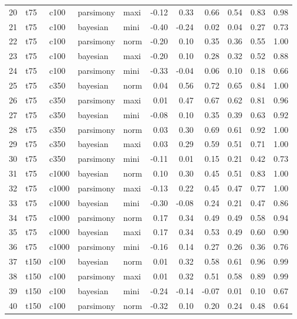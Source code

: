 \documentclass[12pt,letterpaper]{article}
\begin{document}
\begin{longtable}{rllllrrrrrr}
  20 & t75 & c100 & parsimony & maxi & -0.12 & 0.33 & 0.66 & 0.54 & 0.83 & 0.98 \\ 
  21 & t75 & c100 & bayesian & mini & -0.40 & -0.24 & 0.02 & 0.04 & 0.27 & 0.73 \\ 
  22 & t75 & c100 & parsimony & norm & -0.20 & 0.10 & 0.35 & 0.36 & 0.55 & 1.00 \\ 
  23 & t75 & c100 & bayesian & maxi & -0.20 & 0.10 & 0.28 & 0.32 & 0.52 & 0.88 \\ 
  24 & t75 & c100 & parsimony & mini & -0.33 & -0.04 & 0.06 & 0.10 & 0.18 & 0.66 \\ 
  25 & t75 & c350 & bayesian & norm & 0.04 & 0.56 & 0.72 & 0.65 & 0.84 & 1.00 \\ 
  26 & t75 & c350 & parsimony & maxi & 0.01 & 0.47 & 0.67 & 0.62 & 0.81 & 0.96 \\ 
  27 & t75 & c350 & bayesian & mini & -0.08 & 0.10 & 0.35 & 0.39 & 0.63 & 0.92 \\ 
  28 & t75 & c350 & parsimony & norm & 0.03 & 0.30 & 0.69 & 0.61 & 0.92 & 1.00 \\ 
  29 & t75 & c350 & bayesian & maxi & 0.03 & 0.29 & 0.59 & 0.51 & 0.71 & 1.00 \\ 
  30 & t75 & c350 & parsimony & mini & -0.11 & 0.01 & 0.15 & 0.21 & 0.42 & 0.73 \\ 
  31 & t75 & c1000 & bayesian & norm & 0.10 & 0.30 & 0.45 & 0.51 & 0.83 & 1.00 \\ 
  32 & t75 & c1000 & parsimony & maxi & -0.13 & 0.22 & 0.45 & 0.47 & 0.77 & 1.00 \\ 
  33 & t75 & c1000 & bayesian & mini & -0.30 & -0.08 & 0.24 & 0.21 & 0.47 & 0.86 \\ 
  34 & t75 & c1000 & parsimony & norm & 0.17 & 0.34 & 0.49 & 0.49 & 0.58 & 0.94 \\ 
  35 & t75 & c1000 & bayesian & maxi & 0.17 & 0.34 & 0.53 & 0.49 & 0.60 & 0.90 \\ 
  36 & t75 & c1000 & parsimony & mini & -0.16 & 0.14 & 0.27 & 0.26 & 0.36 & 0.76 \\ 
  37 & t150 & c100 & bayesian & norm & 0.01 & 0.32 & 0.58 & 0.61 & 0.96 & 0.99 \\ 
  38 & t150 & c100 & parsimony & maxi & 0.01 & 0.32 & 0.51 & 0.58 & 0.89 & 0.99 \\ 
  39 & t150 & c100 & bayesian & mini & -0.24 & -0.14 & -0.07 & 0.01 & 0.10 & 0.67 \\ 
  40 & t150 & c100 & parsimony & norm & -0.32 & 0.10 & 0.20 & 0.24 & 0.48 & 0.64 \\ 

\end{longtable}
\end{document}
